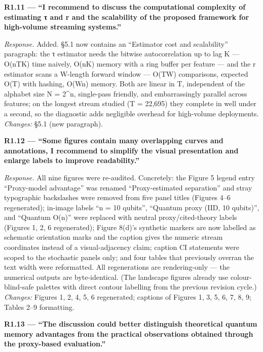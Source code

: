 \documentclass[
  11pt,
]{article}
\begin{document}
\textbf{R1.11 --- ``I recommend to discuss the computational complexity
of estimating τ and r and the scalability of the proposed framework for
high-volume streaming systems.''}

\emph{Response.} Added. §5.1 now contains an ``Estimator cost and
scalability'' paragraph: the τ estimator needs the bitwise
autocorrelation up to lag K --- O(nTK) time naively, O(nK) memory with a
ring buffer per feature --- and the r estimator scans a W-length forward
window --- O(TW) comparisons, expected O(T) with hashing, O(Wn) memory.
Both are linear in T, independent of the alphabet size N = 2\^{}n,
single-pass friendly, and embarrassingly parallel across features; on
the longest stream studied (T = 22,695) they complete in well under a
second, so the diagnostic adds negligible overhead for high-volume
deployments. \emph{Changes:} §5.1 (new paragraph).

\textbf{R1.12 --- ``Some figures contain many overlapping curves and
annotations, I recommend to simplify the visual presentation and enlarge
labels to improve readability.''}

\emph{Response.} All nine figures were re-audited. Concretely: the
Figure 5 legend entry ``Proxy-model advantage'' was renamed
``Proxy-estimated separation'' and stray typographic backslashes were
removed from five panel titles (Figures 4--6 regenerated); in-image
labels ``n = 10 qubits'', ``Quantum proxy (IID, 10 qubits)'', and
``Quantum O(n)'' were replaced with neutral proxy/cited-theory labels
(Figures 1, 2, 6 regenerated); Figure 8(d)'s synthetic markers are now
labelled as schematic orientation marks and the caption gives the
numeric stream coordinates instead of a visual-adjacency claim; caption
CI statements were scoped to the stochastic panels only; and four tables
that previously overran the text width were reformatted. All
regenerations are rendering-only --- the numerical outputs are
byte-identical. (The landscape figures already use colour-blind-safe
palettes with direct contour labelling from the previous revision
cycle.) \emph{Changes:} Figures 1, 2, 4, 5, 6 regenerated; captions of
Figures 1, 3, 5, 6, 7, 8, 9; Tables 2--9 formatting.

\textbf{R1.13 --- ``The discussion could better distinguish theoretical
quantum memory advantages from the practical observations obtained
through the proxy-based evaluation.''}
\end{document}

